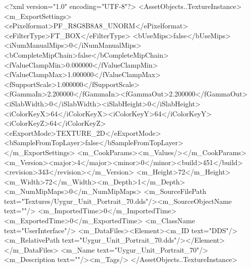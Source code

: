 <?xml version="1.0" encoding="UTF-8"?>
<AssetObjects..TextureInstance>
  <m_ExportSettings>
    <ePixelformat>PF_R8G8B8A8_UNORM</ePixelformat><eFilterType>FT_BOX</eFilterType>
    <bUseMips>false</bUseMips><iNumManualMips>0</iNumManualMips><bCompleteMipChain>false</bCompleteMipChain>
    <fValueClampMin>0.000000</fValueClampMin><fValueClampMax>1.000000</fValueClampMax><fSupportScale>1.000000</fSupportScale>
    <fGammaIn>2.200000</fGammaIn><fGammaOut>2.200000</fGammaOut><iSlabWidth>0</iSlabWidth><iSlabHeight>0</iSlabHeight>
    <iColorKeyX>64</iColorKeyX><iColorKeyY>64</iColorKeyY><iColorKeyZ>64</iColorKeyZ>
    <eExportMode>TEXTURE_2D</eExportMode><bSampleFromTopLayer>false</bSampleFromTopLayer>
  </m_ExportSettings>
  <m_CookParams><m_Values/></m_CookParams>
  <m_Version><major>4</major><minor>0</minor><build>451</build><revision>343</revision></m_Version>
  <m_Height>72</m_Height><m_Width>72</m_Width><m_Depth>1</m_Depth><m_NumMipMaps>0</m_NumMipMaps>
  <m_SourceFilePath text="Textures/Uygur_Unit_Portrait_70.dds"/><m_SourceObjectName text=""/>
  <m_ImportedTime>0</m_ImportedTime><m_ExportedTime>0</m_ExportedTime>
  <m_ClassName text="UserInterface"/>
  <m_DataFiles><Element><m_ID text="DDS"/><m_RelativePath text="Uygur_Unit_Portrait_70.dds"/></Element></m_DataFiles>
  <m_Name text="Uygur_Unit_Portrait_70"/><m_Description text=""/><m_Tags/>
</AssetObjects..TextureInstance>
